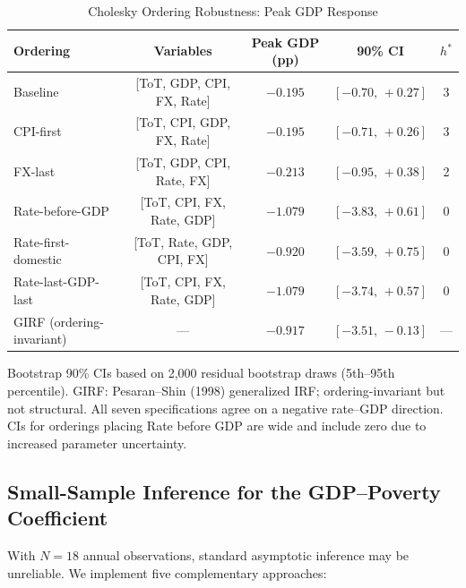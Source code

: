 \documentclass[12pt,letterpaper]{article}
\renewenvironment{tablenotes}{%
  \par\vspace{2pt}%
  \begin{minipage}{\linewidth}%
  \singlespacing%
}{%
  \end{minipage}%
}
\newenvironment{mytable}[2]{%
  \begin{table}[H]
  \centering
  \caption{#1}
  \label{#2}
  \begin{threeparttable}
}{%
  \end{threeparttable}
  \end{table}
}
\begin{document}
\begin{mytable}{Cholesky Ordering Robustness: Peak GDP Response}{tab:ordering}
\footnotesize
\setlength{\tabcolsep}{4pt}
\begin{tabular}{lcccc}
\toprule
Ordering & Variables & Peak GDP (pp) & 90\% CI & $h^*$ \\
\midrule
Baseline             & [ToT, GDP, CPI, FX, Rate]  & $-0.195$ & $[-0.70,\,+0.27]$ & 3 \\
CPI-first            & [ToT, CPI, GDP, FX, Rate]  & $-0.195$ & $[-0.71,\,+0.26]$ & 3 \\
FX-last              & [ToT, GDP, CPI, Rate, FX]  & $-0.213$ & $[-0.95,\,+0.38]$ & 2 \\
Rate-before-GDP      & [ToT, CPI, FX, Rate, GDP]  & $-1.079$ & $[-3.83,\,+0.61]$ & 0 \\
Rate-first-domestic  & [ToT, Rate, GDP, CPI, FX]  & $-0.920$ & $[-3.59,\,+0.75]$ & 0 \\
Rate-last-GDP-last   & [ToT, CPI, FX, Rate, GDP]  & $-1.079$ & $[-3.74,\,+0.57]$ & 0 \\
\midrule
GIRF (ordering-invariant) & ---                   & $-0.917$ & $[-3.51,\,-0.13]$ & --- \\
\bottomrule
\end{tabular}
\begin{tablenotes}
\small Bootstrap 90\% CIs based on 2,000 residual bootstrap draws (5th--95th percentile).
GIRF: Pesaran--Shin (1998) generalized IRF; ordering-invariant but not structural.
All seven specifications agree on a negative rate--GDP direction. CIs for orderings
placing Rate before GDP are wide and include zero due to increased parameter uncertainty.
\end{tablenotes}
\end{mytable}

\subsection{Small-Sample Inference for the GDP--Poverty Coefficient}
\label{app:rob:smallsample}

With $N=18$ annual observations, standard asymptotic inference may be
unreliable. We implement five complementary approaches:
\end{document}
